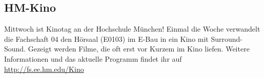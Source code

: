 \subsection{HM-Kino}
Mittwoch ist Kinotag an der Hochschule München! 
Einmal die Woche verwandelt die Fachschaft 04 den Hörsaal (E0103) 
im E-Bau in ein Kino mit Surround-Sound. Gezeigt werden Filme, die oft 
erst vor Kurzem im Kino liefen. 
Weitere Informationen und das aktuelle Programm findet ihr auf 
\url{http://fs.ee.hm.edu/Kino}